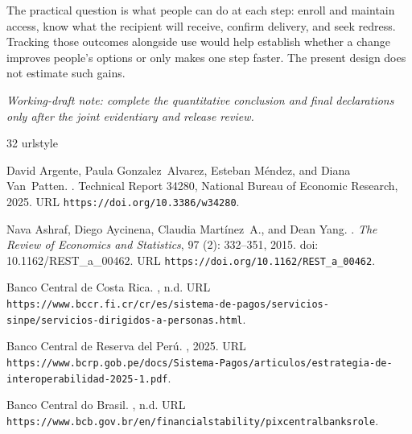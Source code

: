 \documentclass[12pt]{article}
\begin{document}
The practical question is what people can do at each step: enroll and maintain access, know what the recipient will receive, confirm delivery, and seek redress. Tracking those outcomes alongside use would help establish whether a change improves people's options or only makes one step faster. The present design does not estimate such gains.

\emph{Working-draft note: complete the quantitative conclusion and final declarations only after the joint evidentiary and release review.}

\begin{thebibliography}{32}
\providecommand{\natexlab}[1]{#1}
\providecommand{\url}[1]{\texttt{#1}}
\expandafter\ifx\csname urlstyle\endcsname\relax
  \providecommand{\doi}[1]{doi: #1}\else
  \providecommand{\doi}{doi: \begingroup \urlstyle{rm}\Url}\fi

David Argente, Paula Gonzalez~Alvarez, Esteban Méndez, and Diana Van~Patten.
.
\newblock Technical Report 34280, National Bureau of Economic Research, 2025.
\newblock URL \url{https://doi.org/10.3386/w34280}.

Nava Ashraf, Diego Aycinena, Claudia Martínez~A., and Dean Yang.
.
\newblock \emph{The Review of Economics and Statistics}, 97 (2): 332--351, 2015.
\newblock \doi{10.1162/REST_a_00462}.
\newblock URL \url{https://doi.org/10.1162/REST_a_00462}.

{Banco Central de Costa Rica}.
, n.d.
\newblock URL \url{https://www.bccr.fi.cr/cr/es/sistema-de-pagos/servicios-sinpe/servicios-dirigidos-a-personas.html}.

{Banco Central de Reserva del Perú}.
, 2025.
\newblock URL \url{https://www.bcrp.gob.pe/docs/Sistema-Pagos/articulos/estrategia-de-interoperabilidad-2025-1.pdf}.

{Banco Central do Brasil}.
, n.d.
\newblock URL \url{https://www.bcb.gov.br/en/financialstability/pixcentralbanksrole}.


\end{thebibliography}
\end{document}

